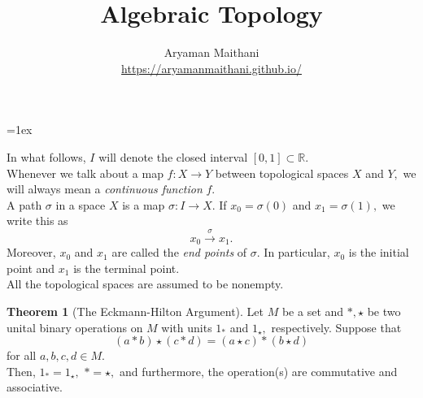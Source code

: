 \documentclass[12pt]{article}
\title{Algebraic Topology}
\author{Aryaman Maithani\\\url{https://aryamanmaithani.github.io/}}
\theoremstyle{definition}
\newtheorem{thm}{Theorem}
\numberwithin{thm}{section}
\begin{document}
\font=1ex
\maketitle

In what follows, $I$ will denote the closed interval $[0, 1] \subset \mathbb{R}.$\\
Whenever we talk about a map $f:X\to Y$ between topological spaces $X$ and $Y,$ we will always mean a \emph{continuous function} $f.$\\
A path $\sigma$ in a space $X$ is a map $\sigma: I \to X.$ If $x_0 = \sigma(0)$ and $x_1 = \sigma(1),$ we write this as
\begin{equation*} 
	x_0 \overset{\sigma}{\longrightarrow} x_1.
\end{equation*}
Moreover, $x_0$ and $x_1$ are called the \emph{end points} of $\sigma.$ In particular, $x_0$ is the initial point and $x_1$ is the terminal point.\\
All the topological spaces are assumed to be nonempty.\\
\begin{thm}[The Eckmann-Hilton Argument] \label{thm:eckmannhilton}
	Let $M$ be a set and $*, \star$ be two unital binary operations on $M$ with units $1_*$ and $1_\star,$ respectively. Suppose that
	\begin{equation*} 
		(a * b) \star (c * d) = (a \star c) * (b \star d)
	\end{equation*}
	for all $a, b, c, d \in M.$\\
	Then, $1_* = 1_\star,$ $* = \star,$ and furthermore, the operation(s) are commutative and associative.
\end{thm}
\end{document}
